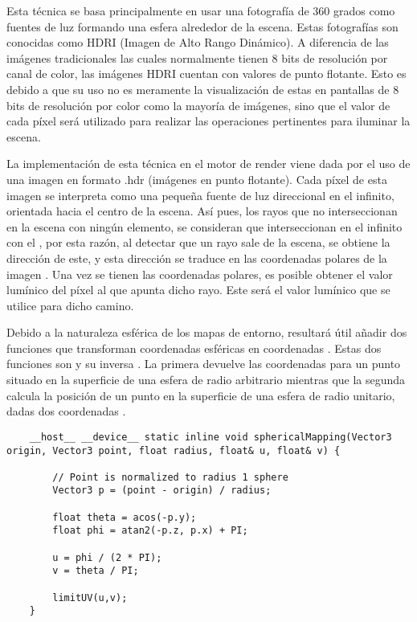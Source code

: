 Esta técnica se basa principalmente en usar una fotografía de 360 grados como fuentes de luz formando una esfera alrededor de la escena. Estas fotografías son conocidas como HDRI (Imagen de Alto Rango Dinámico). A diferencia de las imágenes tradicionales las cuales normalmente tienen 8 bits de resolución por canal de color, las imágenes HDRI cuentan con valores de punto flotante. Esto es debido a que su uso no es meramente la visualización de estas en pantallas de 8 bits de resolución por color como la mayoría de imágenes, sino que el valor de cada píxel será utilizado para realizar las operaciones pertinentes para iluminar la escena.

La implementación de esta técnica en el motor de render viene dada por el uso de una imagen en formato .hdr (imágenes en punto flotante). Cada píxel de esta imagen se interpreta como una pequeña fuente de luz direccional en el infinito, orientada hacia el centro de la escena. Así pues, los rayos que no interseccionan en la escena con ningún elemento, se consideran que interseccionan en el infinito con el , por esta razón, al detectar que un rayo sale de la escena, se obtiene la dirección de este, y esta dirección se traduce en las coordenadas polares de la imagen . Una vez se tienen las coordenadas polares, es posible obtener el valor lumínico del píxel al que apunta dicho rayo. Este será el valor lumínico que se utilice para dicho camino.
	
	
	
	
Debido a la naturaleza esférica de los mapas de entorno, resultará útil añadir dos funciones que transforman coordenadas esféricas en coordenadas . Estas dos funciones son  y su inversa . La primera devuelve las coordenadas  para un punto situado en la superficie de una esfera de radio arbitrario mientras que la segunda calcula la posición de un punto en la superficie de una esfera de radio unitario, dadas dos coordenadas .

	\label{sphericalmapping}
	\begin{lstlisting}
    __host__ __device__ static inline void sphericalMapping(Vector3 origin, Vector3 point, float radius, float& u, float& v) {

        // Point is normalized to radius 1 sphere
        Vector3 p = (point - origin) / radius;

        float theta = acos(-p.y);
        float phi = atan2(-p.z, p.x) + PI;

        u = phi / (2 * PI);
        v = theta / PI;

        limitUV(u,v);
    }
	
	\end{lstlisting}
	
